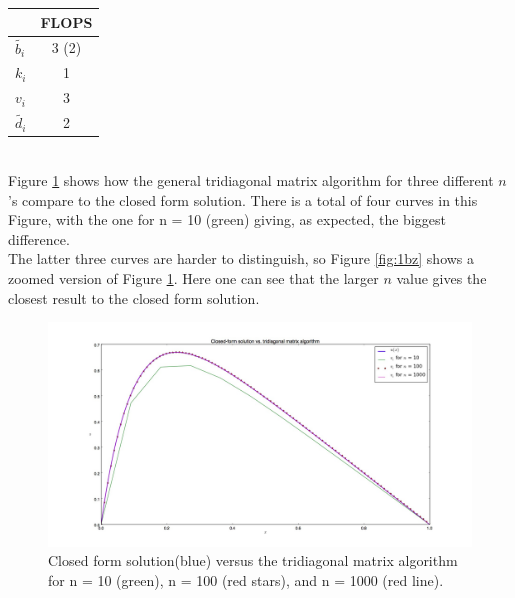 \documentclass[12pt]{article}
\begin{document}
\begin{center}
  \begin{tabular}{ l | c }
    &FLOPS \\ \hline
    $\tilde{b_i}$ & 3 (2) \\
    $k_i$& 1 \\
    $v_i$ & 3 \\
    $\tilde{d_i}$ & 2
  \end{tabular}
\end{center}
\\
\noindent Figure \ref{fig:1b} shows how the general tridiagonal matrix algorithm for three different $n$'s compare to the closed form solution. There is a total of four curves in this Figure, with the one for n = 10 (green) giving, as expected, the biggest difference. \\
\noindent The latter three curves are harder to distinguish, so Figure \ref{fig:1bz} shows a zoomed version of Figure \ref{fig:1b}. Here one can see that the larger $n$ value gives the closest result to the closed form solution.
\begin{center}
    \begin{figure}[h!]
        \includegraphics[width=1.4\textwidth]{figure_1b.png}
        \caption{Closed form solution(blue) versus the     tridiagonal matrix algorithm for n = 10     (green), n = 100 (red stars), and n = 1000 (red line). }
        \label{fig:1b}
    \end{figure}
\end{center}
\end{document}
